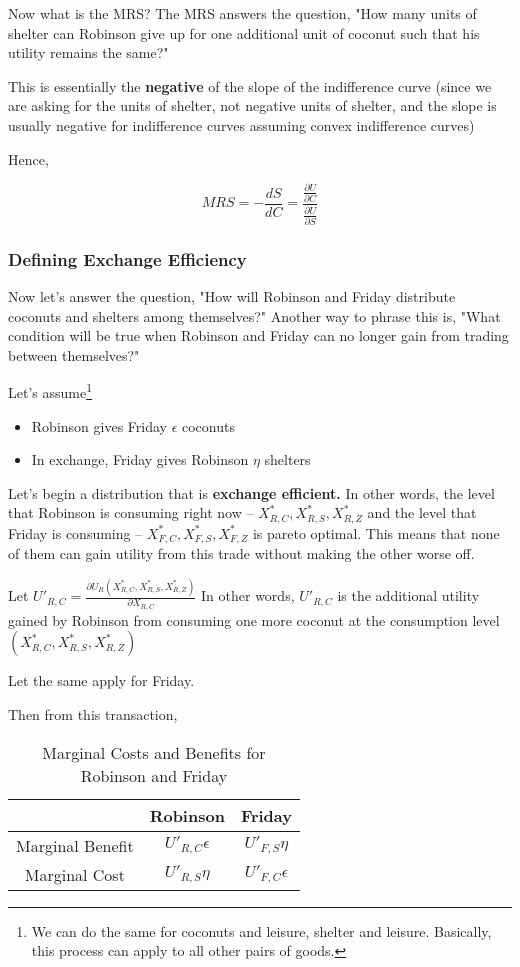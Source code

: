 \documentclass[11pt]{scrartcl}
\begin{document}
Now what is the MRS? The MRS answers the question, "How many units of shelter can Robinson give up for one additional unit of coconut such that his utility remains the same?"

This is essentially the \textbf{negative} of the slope of the indifference curve (since we are asking for the units of shelter, not negative units of shelter, and the slope is usually negative for indifference curves assuming convex indifference curves)

Hence, 

\[MRS = -\frac{dS}{dC} = \frac{\frac{\partial U}{\partial C}}{\frac{\partial U}{\partial S}}\]

\subsubsection{Defining Exchange Efficiency}

Now let's answer the question, "How will Robinson and Friday distribute coconuts and shelters among themselves?" Another way to phrase this is, "What condition will be true when Robinson and Friday can no longer gain from trading between themselves?"

Let's assume\footnote{We can do the same for coconuts and leisure, shelter and leisure. Basically, this process can apply to all other pairs of goods.}

\begin{itemize}
\item Robinson gives Friday $\epsilon$ coconuts
\item In exchange, Friday gives Robinson $\eta$ shelters
\end{itemize}

Let's begin a distribution that is \textbf{exchange efficient.} In other words, the level that Robinson is consuming right now -- $X^*_{R,C}, X^*_{R,S}, X^*_{R,Z}$ and the level that Friday is consuming -- $X^*_{F,C}, X^*_{F,S}, X^*_{F,Z}$ is pareto optimal. This means that none of them can gain utility from this trade without making the other worse off.

Let $U'_{R,C} = \frac{\partial U_R(X^*_{R,C}, X^*_{R,S}, X^*_{R,Z})}{\partial X_{R,C}}$ In other words, $U'_{R,C}$ is the additional utility gained by Robinson from consuming one more coconut at the consumption level $(X^*_{R,C}, X^*_{R,S}, X^*_{R,Z})$

Let the same apply for Friday.

Then from this transaction,

\begin{table}[ht!]
\begin{longtable}{c|cc}
\hline
 & Robinson & Friday \\
\hline
Marginal Benefit & $U'_{R,C} \epsilon$ & $U'_{F,S} \eta$ \\
Marginal Cost & $U'_{R,S} \eta$ & $U'_{F,C} \epsilon$ \\
\hline
\end{longtable}
\caption{Marginal Costs and Benefits for Robinson and Friday}
\end{table}
\end{document}
